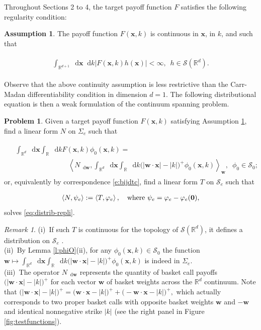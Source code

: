 \documentclass[11pt,A4,twoside]{article}
\numberwithin{equation}{section}
\renewcommand{\b}[1]{{\color{blue}#1}}
\renewcommand*\d{\mathop{}\!\mathrm{d}}
\newcommand{\inner}[1]{\left\langle#1 \right\rangle}
\newcommand{\x}{\mathbf{x}}
\newcommand{\w}{\mathbf{w}}
\newcommand{\R}{\mathbbm{R}}
\renewcommand{\S}{\mathcal{S}}
\newcommand{\M}{\Sigma}
\newcommand{\intRd}{\int_{\R^d}}
\newcommand{\intR}{\int_{\R}}
\def\qqq{\;\;\;\;\;\;\;\;\;}
\newcommand{\beqa}{\begin{eqnarray}}
\newcommand{\eeqa}{\end{eqnarray}}
\def\bal{\begin{aligned}}
\def\eal{\end{aligned}}
\def\bll#1{
\beqa\label{#1}\bal
}\def\lel{\eal\eeqa}
\newcommand{\beql}[1]{\bll{#1}}
\newcommand{\eeql}{\lel}
\theoremstyle{definition}
\newtheorem{problem}{Problem}[section]
\newtheorem{assumption}[definition]{Assumption}
\theoremstyle{remark}
\newtheorem{remark}{Remark}[section]
\def\sp{,\;}
\def\R{\mathbb{R}}
\def\varphie{\varphi_e}
\def\theh{\b{h}}\def\theh{h}
\begin{document}
Throughout Sections 2 to 4, the target payoff function $F$ satisfies the following regularity condition:
\begin{assumption}\label{ass:pay} The payoff function $F(\x,k)$ is continuous in $\x$, in $k$, and such that
\beql{e:pay} \int_{\R^{d+1}} \d \x \d k |F(\x,k) \theh(\x)|   <\infty\sp\   \theh\in\mathcal{S}(\R^d).\eeql
\end{assumption}
\noindent
Observe that the above continuity assumption is less restrictive than the Carr-Madan differentiability condition in dimension $d=1$.  The following distributional equation is then a weak formulation of the continuum spanning problem.
\begin{problem}\label{def:span} Given a target payoff function $F(\x, k)$ satisfying Assumption \ref{ass:pay}, find a linear form $N$ on $\M_e$ such that
\beql{eq:distrib-repli}
  &  \intRd \d \x \intR  \d k F(\x,k)\phi_0 (\x,k)
  =  \\
    &\qqq\qqq\qqq   \inner{N_{\d \w}, \intRd \d\x \intR  \d k \big(|\w \cdot \x | - |k |\big)^+ \phi_0 (\x,k) }_{\w}\sp\  \phi_0 \in \S_0;
\eeql
or, equivalently by correspondence \eqref{e:bijdtc}, find a linear form $T$ on $\S_e$  such that
\beql{e:T}
    \inner{N , \psi_e   } := \inner{T , \varphi_e  } , \quad \mbox{where } \psi_e= \varphie  -   \varphie ({\bf 0}),
\eeql
solves \eqref{eq:distrib-repli}.
\end{problem} 
\begin{remark}
    (i)~If such $T$ is continuous for the topology of $\S(\R^d)$, it defines a distribution on $\S_e$ \citep[Definitions page 22]{kanwal}. \\
    \noindent
    (ii)~By Lemma \ref{l:phiO}(ii), for any $\phi_0 (\x,k)\in\S_0$ the function $\w \mapsto \intRd \d\x \intR  \d k \big(|\w \cdot \x | - |k |\big)^+ \phi_0 (\x,k)$ is indeed in $\M_e$.  \\
    \noindent
    (iii)~The operator $N_{\d \w}$ represents the quantity of basket call payoffs $\big(|\w \cdot \x | - |k |\big)^+$ for each vector $\w$ of basket weights across the $\R^d$ continuum. Note that $\big(|\w \cdot \x | - |k |\big)^+ = \big(\w \cdot \x - |k |\big)^+ + \big(-\w \cdot \x - |k |\big)^+ ,$ which actually corresponds to two proper basket calls with opposite basket weights $\w$ and $-\w$ and identical nonnegative strike $|k|$ (see the right panel in Figure \ref{fig:testfunctions}).
\end{remark}
\end{document}
